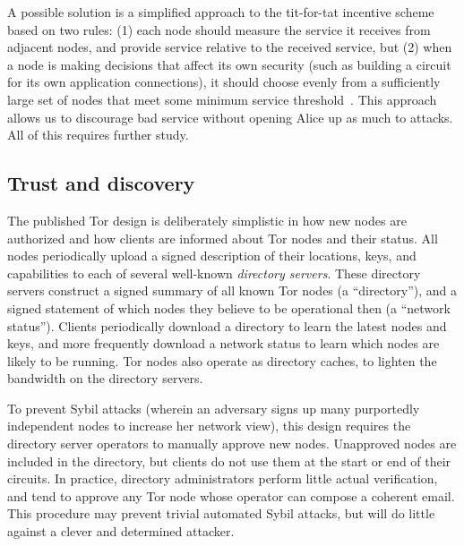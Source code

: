 \documentclass{llncs}
\begin{document}

A possible solution is a simplified approach to the tit-for-tat
incentive scheme based on two rules: (1) each node should measure the
service it receives from adjacent nodes, and provide service relative
to the received service, but (2) when a node is making decisions that
affect its own security (such as building a circuit for its own
application connections), it should choose evenly from a sufficiently
large set of nodes that meet some minimum service
threshold~\cite{casc-rep}.  This approach allows us to discourage
bad service
without opening Alice up as much to attacks.  All of this requires
further study.

\subsection{Trust and discovery}
\label{subsec:trust-and-discovery}

The published Tor design is deliberately simplistic in how
new nodes are authorized and how clients are informed about Tor
nodes and their status.
All nodes periodically upload a signed description
of their locations, keys, and capabilities to each of several well-known {\it
  directory servers}.  These directory servers construct a signed summary
of all known Tor nodes (a ``directory''), and a signed statement of which
nodes they
believe to be operational then (a ``network status'').  Clients
periodically download a directory to learn the latest nodes and
keys, and more frequently download a network status to learn which nodes are
likely to be running.  Tor nodes also operate as directory caches, to
lighten the bandwidth on the directory servers.

To prevent Sybil attacks (wherein an adversary signs up many
purportedly independent nodes to increase her network view),
this design
requires the directory server operators to manually
approve new nodes.  Unapproved nodes are included in the directory,
but clients
do not use them at the start or end of their circuits.  In practice,
directory administrators perform little actual verification, and tend to
approve any Tor node whose operator can compose a coherent email.
This procedure
may prevent trivial automated Sybil attacks, but will do little
against a clever and determined attacker.
\end{document}
